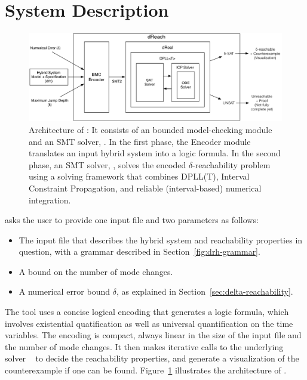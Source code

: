 \section{System Description}\label{sec:system}
\begin{figure}[!h]
  \centering
  \includegraphics[width=\textwidth]{images/dreach_archi}
  \caption{Architecture of \dReach{}: It consists of an bounded
    model-checking module and an SMT solver, \dReal{}. In the first
    phase, the Encoder module translates an input hybrid system into a
    logic formula. In the second phase, an
    SMT solver, \dReal{}, solves the encoded $\delta$-reachability
    problem using a solving framework that combines DPLL(T), Interval Constraint Propagation, and reliable (interval-based) numerical integration.
  }
  \label{fig:system-description}
\end{figure}
\dReach{} asks the user to provide one input file and two parameters as follows:
\begin{itemize}
\item The input file that describes the hybrid system and reachability properties in question, with a grammar described in Section~\ref{fig:drh-grammar}.
\item A bound on the number of mode changes.
\item A numerical error bound $\delta$, as explained in Section~\ref{sec:delta-reachability}.
\end{itemize}

The tool uses a concise logical encoding that generates a logic formula, which involves existential quatification as well as universal quantification on the time variables. The encoding is compact, always linear in the size of the input file and the number of mode changes. It then makes iterative calls to the underlying solver \dReal{}~\cite{DBLP:conf/cade/GaoKC13} to decide the reachability properties, and generate a visualization of the counterexample if one can be found. Figure~\ref{fig:system-description} illustrates the architecture of
\dReach{}.

